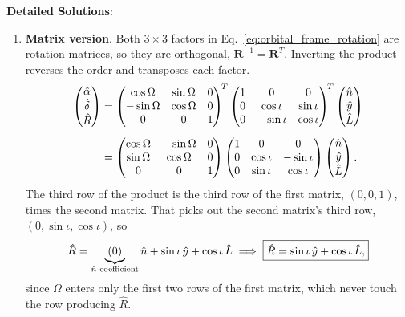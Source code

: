 \textbf{Detailed Solutions}:
\begin{enumerate}[label=(\alph*)]
	\item \textbf{Matrix version}. Both $3\times3$ factors in Eq.~\eqref{eq:orbital_frame_rotation} are rotation matrices, so they are orthogonal, $\mathbf R^{-1}=\mathbf R^T$. Inverting the product reverses the order and transposes each factor.
	\begin{align*}
	\begin{pmatrix}\hat\alpha\\\hat\delta\\\hat R\end{pmatrix}
	&=\begin{pmatrix}\cos\Omega&\sin\Omega&0\\-\sin\Omega&\cos\Omega&0\\0&0&1\end{pmatrix}^{\!T}
	\begin{pmatrix}1&0&0\\0&\cos\iota&\sin\iota\\0&-\sin\iota&\cos\iota\end{pmatrix}^{\!T}
	\begin{pmatrix}\hat n\\\hat y\\\hat L\end{pmatrix}\\[4pt]
	&=\begin{pmatrix}\cos\Omega&-\sin\Omega&0\\\sin\Omega&\cos\Omega&0\\0&0&1\end{pmatrix}
	\begin{pmatrix}1&0&0\\0&\cos\iota&-\sin\iota\\0&\sin\iota&\cos\iota\end{pmatrix}
	\begin{pmatrix}\hat n\\\hat y\\\hat L\end{pmatrix}.
	\end{align*}
	The third row of the product is the third row of the first matrix, $(0,0,1)$, times the second matrix. That picks out the second matrix's third row, $(0,\sin\iota,\cos\iota)$, so
	\[
	\hat R = \underbrace{(0)}_{\hat n\text{-coefficient}}\hat n+\sin\iota\,\hat y+\cos\iota\,\hat L
	\;\Longrightarrow\;
	\boxed{\hat R=\sin\iota\,\hat y+\cos\iota\,\hat L,}
	\]
	since $\Omega$ enters only the first two rows of the first matrix, which never touch the row producing $\hat R$.
	

\end{enumerate}
